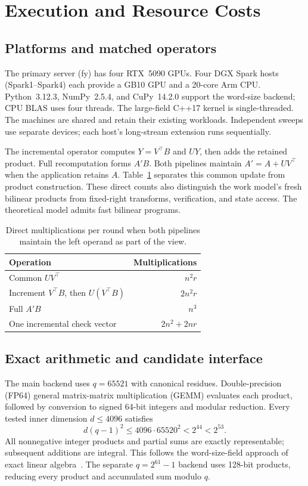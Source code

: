 \section{Execution and Resource Costs}\label{sec:execution}
\subsection{Platforms and matched operators}
The primary server (fy) has four RTX~5090 GPUs. Four DGX Spark hosts
(Spark1--Spark4) each provide a GB10 GPU and a 20-core Arm CPU.
Python~3.12.3, NumPy~2.5.4, and CuPy~14.2.0 support the word-size
backend; CPU BLAS uses four threads. The large-field C++17 kernel is
single-threaded. The machines are shared and retain their existing
workloads. Independent sweeps use separate devices; each host's
long-stream extension runs sequentially.

The incremental operator computes $Y=V^\top B$ and $UY$, then adds
the retained product. Full recomputation forms $A'B$. Both pipelines
maintain $A'=A+UV^\top$ when the application retains $A$.
Table~\ref{tab:resource-counts} separates this common update from product
construction. These direct counts also distinguish the work model's
fresh bilinear products from fixed-right transforms, verification, and
state access. The theoretical model admits fast bilinear programs.

\begin{table}[t]
\caption{Direct multiplications per round when both pipelines maintain the left operand as part of the view.}\label{tab:resource-counts}
\centering
\begin{tabular}{lr}\toprule
Operation & Multiplications\\\midrule
Common $UV^\top$ & $n^2r$\\
Increment $V^\top B$, then $U(V^\top B)$ & $2n^2r$\\
Full $A'B$ & $n^3$\\
One incremental check vector & $2n^2+2nr$\\\bottomrule
\end{tabular}
\end{table}

\subsection{Exact arithmetic and candidate interface}
The main backend uses $q=65521$ with canonical residues. Double-precision
(FP64) general matrix-matrix multiplication (GEMM)
evaluates each product, followed by conversion to signed 64-bit integers
and modular reduction. Every tested inner dimension $d\le4096$ satisfies
\[
 d(q-1)^2\le4096\cdot65520^2<2^{44}<2^{53}.
\]
All nonnegative integer products and partial sums are exactly
representable; subsequent additions are integral. This follows the
word-size-field approach of exact linear algebra~\cite{dumas2008fflas}.
The separate $q=2^{61}-1$ backend uses 128-bit products, reducing every
product and accumulated sum modulo $q$.

